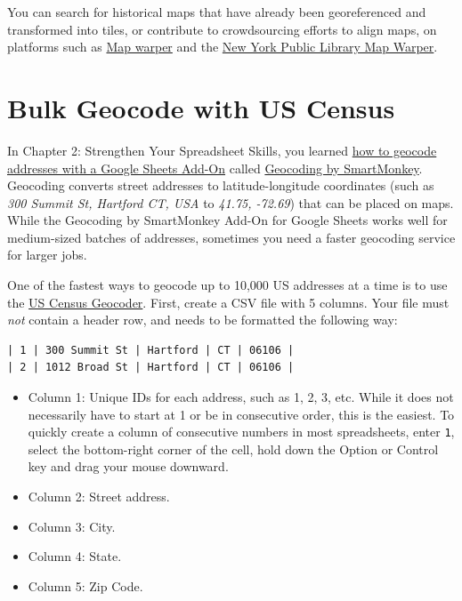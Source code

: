 \documentclass[
  english,
]{book}
\providecommand{\tightlist}{%
  \setlength{\itemsep}{0pt}\setlength{\parskip}{0pt}}
\begin{document}
You can search for historical maps that have already been georeferenced and transformed into tiles, or contribute to crowdsourcing efforts to align maps, on platforms such as \href{https://mapwarper.net}{Map warper} and the \href{http://maps.nypl.org/warper/}{New York Public Library Map Warper}.

\hypertarget{bulk-geocode}{%
\section*{Bulk Geocode with US Census}\label{bulk-geocode}}

In Chapter 2: Strengthen Your Spreadsheet Skills, you learned \href{geocode.html}{how to geocode addresses with a Google Sheets Add-On} called \href{https://gsuite.google.com/marketplace/app/geocoding_by_smartmonkey/1033231575312}{Geocoding by SmartMonkey}. Geocoding converts street addresses to latitude-longitude coordinates (such as \emph{300 Summit St, Hartford CT, USA} to \emph{41.75, -72.69}) that can be placed on maps. While the Geocoding by SmartMonkey Add-On for Google Sheets works well for medium-sized batches of addresses, sometimes you need a faster geocoding service for larger jobs.

One of the fastest ways to geocode up to 10,000 US addresses at a time is to use the \href{https://geocoding.geo.census.gov/geocoder/locations/addressbatch?form}{US Census Geocoder}. First, create a CSV file with 5 columns. Your file must \emph{not} contain a header row, and needs to be formatted the following way:

\begin{verbatim}
| 1 | 300 Summit St | Hartford | CT | 06106 |
| 2 | 1012 Broad St | Hartford | CT | 06106 |
\end{verbatim}

\begin{itemize}
\tightlist
\item
  Column 1: Unique IDs for each address, such as 1, 2, 3, etc. While it does not necessarily have to start at 1 or be in consecutive order, this is the easiest. To quickly create a column of consecutive numbers in most spreadsheets, enter \texttt{1}, select the bottom-right corner of the cell, hold down the Option or Control key and drag your mouse downward.
\item
  Column 2: Street address.
\item
  Column 3: City.
\item
  Column 4: State.
\item
  Column 5: Zip Code.
\end{itemize}
\end{document}

